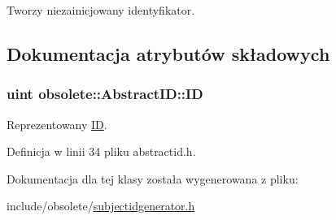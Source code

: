 Tworzy niezainicjowany identyfikator. 



\subsection{Dokumentacja atrybutów składowych}
\hypertarget{classobsolete_1_1AbstractID_a5f67fa1c7d96085f0ef41193b60b570c}{
\subsubsection[{ID}]{\setlength{\rightskip}{0pt plus 5cm}uint {\bf obsolete::AbstractID::ID}}}
\label{classobsolete_1_1AbstractID_a5f67fa1c7d96085f0ef41193b60b570c}


Reprezentowany \hyperlink{classobsolete_1_1ID}{ID}. 



Definicja w linii 34 pliku abstractid.h.



Dokumentacja dla tej klasy została wygenerowana z pliku:\begin{DoxyCompactItemize}
\item 
include/obsolete/\hyperlink{subjectidgenerator_8h}{subjectidgenerator.h}\end{DoxyCompactItemize}
